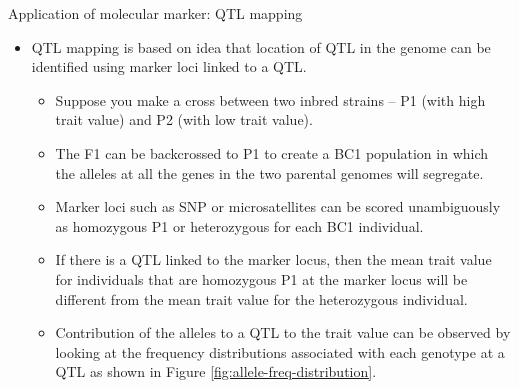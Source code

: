 \documentclass[
  ignorenonframetext,
  aspectratio=169]{beamer}
\providecommand{\tightlist}{%
  \setlength{\itemsep}{0pt}\setlength{\parskip}{0pt}}
\begin{document}
\begin{frame}{Application of molecular marker: QTL mapping}
\protect\hypertarget{application-of-molecular-marker-qtl-mapping}{}
\footnotesize

\begin{itemize}
\tightlist
\item
  QTL mapping is based on idea that location of QTL in the genome can be
  identified using marker loci linked to a QTL.

  \begin{itemize}
  \tightlist
  \item
    Suppose you make a cross between two inbred strains -- P1 (with high
    trait value) and P2 (with low trait value).
  \item
    The F1 can be backcrossed to P1 to create a BC1 population in which
    the alleles at all the genes in the two parental genomes will
    segregate.
  \item
    Marker loci such as SNP or microsatellites can be scored
    unambiguously as homozygous P1 or heterozygous for each BC1
    individual.
  \item
    If there is a QTL linked to the marker locus, then the mean trait
    value for individuals that are homozygous P1 at the marker locus
    will be different from the mean trait value for the heterozygous
    individual.
  \item
    Contribution of the alleles to a QTL to the trait value can be
    observed by looking at the frequency distributions associated with
    each genotype at a QTL as shown in Figure
    \ref{fig:allele-freq-distribution}.
  \end{itemize}
\end{itemize}
\end{frame}
\end{document}

